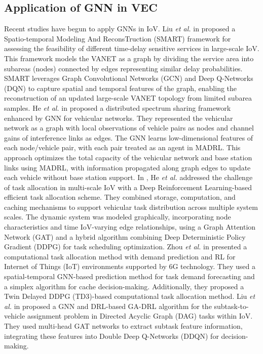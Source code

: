 \documentclass[lettersize,journal,onecolumn]{IEEEtran}
\begin{document}
\subsection{Application of GNN in VEC}

Recent studies have begun to apply GNNs in IoV. 
Liu \emph{et al.} in \cite{ref1} proposed a Spatio-temporal Modeling And ReconsTruction (SMART) framework for assessing the feasibility of different time-delay sensitive services in large-scale IoV. This framework models the VANET as a graph by dividing the service area into subareas (nodes) connected by edges representing similar delay probabilities. SMART leverages Graph Convolutional Networks (GCN) and Deep Q-Networks (DQN) to capture spatial and temporal features of the graph, enabling the reconstruction of an updated large-scale VANET topology from limited subarea samples.
He \emph{et al.} in \cite{ref17} proposed a distributed spectrum sharing framework enhanced by GNN for vehicular networks. They represented the vehicular network as a graph with local observations of vehicle pairs as nodes and channel gains of interference links as edges. The GNN learns low-dimensional features of each node/vehicle pair, with each pair treated as an agent in MADRL. This approach optimizes the total capacity of the vehicular network and base station links using MADRL, with information propagated along graph edges to update each vehicle without base station support.
In \cite{ref18}, He \emph{et al.} addressed the challenge of task allocation in multi-scale IoV with a Deep Reinforcement Learning-based efficient task allocation scheme. They combined storage, computation, and caching mechanisms to support vehicular task distribution across multiple system scales. The dynamic system was modeled graphically, incorporating node characteristics and time IoV-varying edge relationships, using a Graph Attention Network (GAT) and a hybrid algorithm combining Deep Deterministic Policy Gradient (DDPG) for task scheduling optimization.
Zhou \emph{et al.} in \cite{ref19} presented a computational task allocation method with demand prediction and RL for Internet of Things (IoT) environments supported by 6G technology. They used a spatial-temporal GNN-based prediction method for task demand forecasting and a simplex algorithm for cache decision-making. Additionally, they proposed a Twin Delayed DDPG (TD3)-based computational task allocation method.
Liu \emph{et al.} in \cite{ref20} proposed a GNN and DRL-based GA-DRL algorithm for the subtask-to-vehicle assignment problem in Directed Acyclic Graph (DAG) tasks within IoV. They used multi-head GAT networks to extract subtask feature information, integrating these features into Double Deep Q-Networks (DDQN) for decision-making.
\end{document}
